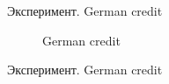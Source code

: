 \documentclass{beamer}
\begin{document}
\begin{frame}{Эксперимент. German credit}

\begin{figure}[H]
      \caption{German credit}
\end{figure}

\end{frame}

\begin{frame}{Эксперимент. German credit}

\end{frame}
\end{document}
